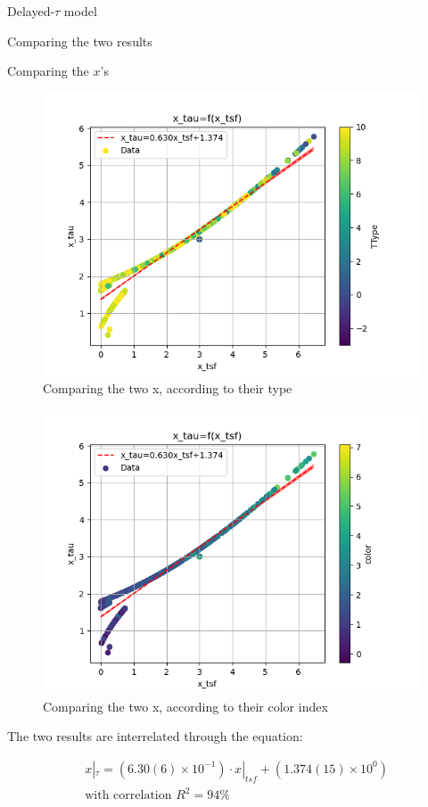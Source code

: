 \documentclass[presentation]{beamer}
\begin{document}
\begin{frame}[label={sec:org05089e9}]{Delayed-\(\tau\) model}
\begin{block}{Comparing the two results}
\begin{block}{Comparing the \(x\)'s}
\begin{figure}[!htpb]
\centering
\includegraphics[width=.9\linewidth]{./figs/x_tsf-x_tau-color_TType.png}
\caption{\label{fig:Comparing the two x, according to their type}Comparing the two x, according to their type}
\end{figure}


\begin{figure}[!htpb]
\centering
\includegraphics[width=.9\linewidth]{./figs/x_tsf-x_tau-color_color.png}
\caption{\label{fig:Comparing the two x, according to their color index}Comparing the two x, according to their color index}
\end{figure}

The two results are interrelated through the equation:

\begin{equation}\label{eq:x_tsf-x_tau}
\begin{align}
& x|_\tau = (6.30(6) \times 10^{-1})\cdot x|_{tsf} + (1.374(15) \times 10^{0}) \\
& \textrm{with correlation } R^2=94\%
\end{align}
\end{equation}
\noindent


\end{block}
\end{block}
\end{frame}
\end{document}

